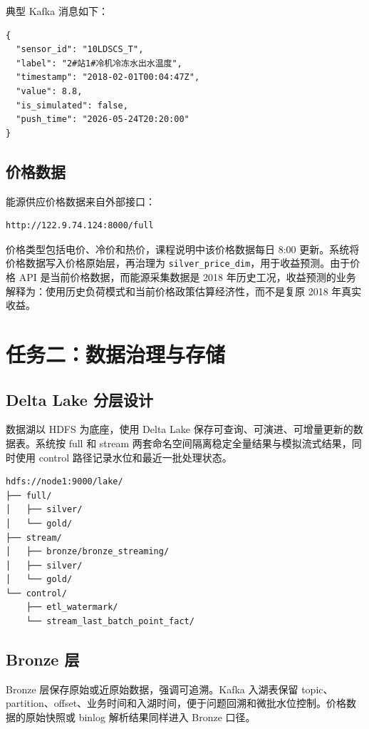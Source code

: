 \documentclass[UTF8,11pt,a4paper]{ctexart}
\newcommand{\code}[1]{\texttt{#1}}
\begin{document}
典型 Kafka 消息如下：

\begin{verbatim}
{
  "sensor_id": "10LDSCS_T",
  "label": "2#站1#冷机冷冻水出水温度",
  "timestamp": "2018-02-01T00:04:47Z",
  "value": 8.8,
  "is_simulated": false,
  "push_time": "2026-05-24T20:20:00"
}
\end{verbatim}

\subsection{价格数据}

能源供应价格数据来自外部接口：

\begin{verbatim}
http://122.9.74.124:8000/full
\end{verbatim}

价格类型包括电价、冷价和热价，课程说明中该价格数据每日 8:00 更新。系统将价格数据写入价格原始层，再治理为 \code{silver\_price\_dim}，用于收益预测。由于价格 API 是当前价格数据，而能源采集数据是 2018 年历史工况，收益预测的业务解释为：使用历史负荷模式和当前价格政策估算经济性，而不是复原 2018 年真实收益。

\section{任务二：数据治理与存储}

\subsection{Delta Lake 分层设计}

数据湖以 HDFS 为底座，使用 Delta Lake 保存可查询、可演进、可增量更新的数据表。系统按 full 和 stream 两套命名空间隔离稳定全量结果与模拟流式结果，同时使用 control 路径记录水位和最近一批处理状态。



\begin{verbatim}
hdfs://node1:9000/lake/
├── full/
│   ├── silver/
│   └── gold/
├── stream/
│   ├── bronze/bronze_streaming/
│   ├── silver/
│   └── gold/
└── control/
    ├── etl_watermark/
    └── stream_last_batch_point_fact/
\end{verbatim}

\subsection{Bronze 层}

Bronze 层保存原始或近原始数据，强调可追溯。Kafka 入湖表保留 topic、partition、offset、业务时间和入湖时间，便于问题回溯和微批水位控制。价格数据的原始快照或 binlog 解析结果同样进入 Bronze 口径。
\end{document}
